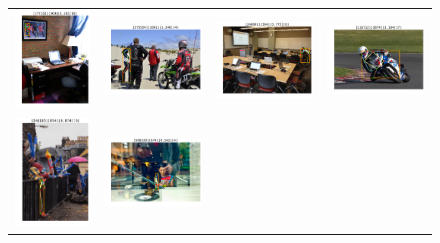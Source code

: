 \documentclass[10pt,onecolumn,letterpaper]{article}
\begin{document}
\begin{figure}[h!]
{\begin{tabular}{c|c|c|c}
\includegraphics[width=.25\linewidth,height=.15\paperwidth,keepaspectratio]{./result/rmpe/localization_errors/keypoints_breakdown/miss_4.pdf} &
\includegraphics[width=.25\linewidth,height=.15\paperwidth,keepaspectratio]{./result/rmpe/localization_errors/keypoints_breakdown/swap_4.pdf} &
\includegraphics[width=.25\linewidth,height=.15\paperwidth,keepaspectratio]{./result/rmpe/localization_errors/keypoints_breakdown/inversion_4.pdf} &
\includegraphics[width=.25\linewidth,height=.15\paperwidth,keepaspectratio]{./result/rmpe/localization_errors/keypoints_breakdown/jitter_4.pdf} \\
\includegraphics[width=.25\linewidth,height=.15\paperwidth,keepaspectratio]{./result/rmpe/localization_errors/keypoints_breakdown/miss_5.pdf} &
\includegraphics[width=.25\linewidth,height=.15\paperwidth,keepaspectratio]{./result/rmpe/localization_errors/keypoints_breakdown/swap_5.pdf} &

\end{tabular}}
\end{figure}
\end{document}
